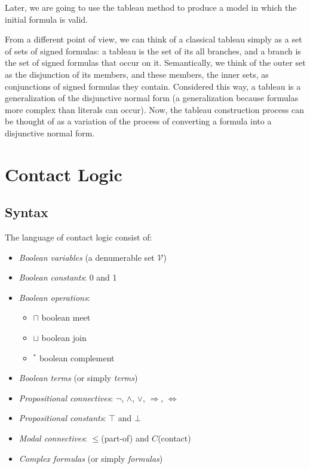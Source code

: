 \documentclass{article}
\newcommand\V{\mathcal{V}}
\begin{document}
	\par
	Later, we are going to use the tableau method to produce a model in which the initial formula is valid.
	\par
	From a different point of view, we can think of a classical tableau simply as a set of sets of signed formulas: a tableau is the set of its all branches, and a branch is the set of signed formulas that occur on it. Semantically, we think of the outer set as the disjunction of its members, and these members, the inner sets, as conjunctions of signed formulas they contain. Considered this way, a tableau is a generalization of the disjunctive normal form (a generalization because formulas more complex than literals can occur). Now, the tableau construction process can be thought of as a variation of the process of converting a formula into a disjunctive normal form.

	\newpage
	\section{Contact Logic}
	\subsection{Syntax}
	The language of contact logic consist of:
	\begin{itemize}
		\item \textit{Boolean variables} (a denumerable set $\V$)
		\item \textit{Boolean constants}: 0 and 1
		\item \textit{Boolean operations}:
		\begin{itemize}
			\item $\sqcap$ boolean meet
			\item $\sqcup$ boolean join
			\item $^*$ boolean complement
		\end{itemize}
		\item \textit{Boolean terms} (or simply \textit{terms})
		\item \textit{Propositional connectives}: $\neg$, $\land$, $\lor$, $\Rightarrow$, $\Leftrightarrow$
		\item \textit{Propositional constants}: $\top$ and $\bot$
		\item \textit{Modal connectives}: $\leq$(part-of) and $C$(contact)
		\item \textit{Complex formulas} (or simply \textit{formulas})
	\end{itemize}
\end{document}
